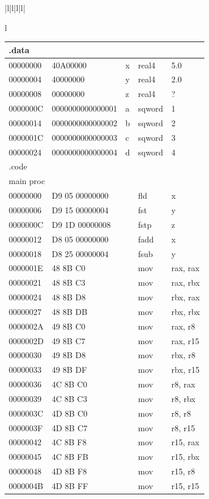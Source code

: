 \documentclass[10pt]{book}
\begin{document}
\begin{center}
\begin{tabular}{|l|l|l|l|}
\begin{tabular}{l}
\begin{center}
\begin{tabular}{|l|l|l|l|l|}
\hline
\multicolumn{5}{|l|}{.data} \\
\hline
00000000 & 40A00000 & x & real4 & 5.0 \\
\hline
00000004 & 40000000 & y & real4 & 2.0 \\
\hline
00000008 & 00000000 & z & real4 & ? \\
\hline
0000000C & 0000000000000001 & a & sqword & 1 \\
\hline
00000014 & 0000000000000002 & b & sqword & 2 \\
\hline
0000001C & 0000000000000003 & c & sqword & 3 \\
\hline
00000024 & 0000000000000004 & d & sqword & 4 \\
\hline
\multicolumn{5}{|l|}{.code} \\
\multicolumn{5}{|l|}{main proc} \\
\hline
00000000 & D9 05 00000000 &  & fld & x \\
\hline
00000006 & D9 15 00000004 &  & fst & y \\
\hline
0000000C & D9 1D 00000008 &  & fstp & z \\
\hline
00000012 & D8 05 00000000 &  & fadd & x \\
\hline
00000018 & D8 25 00000004 &  & fsub & y \\
\hline
0000001E & 48 8B C0 &  & mov & rax, rax \\
\hline
00000021 & 48 8B C3 &  & mov & rax, rbx \\
\hline
00000024 & 48 8B D8 &  & mov & rbx, rax \\
\hline
00000027 & 48 8B DB &  & mov & rbx, rbx \\
\hline
0000002A & 49 8B C0 &  & mov & rax, r8 \\
\hline
0000002D & 49 8B C7 &  & mov & rax, r15 \\
\hline
00000030 & 49 8B D8 &  & mov & rbx, r8 \\
\hline
00000033 & 49 8B DF &  & mov & rbx, r15 \\
\hline
00000036 & 4C 8B C0 &  & mov & r8, rax \\
\hline
00000039 & 4C 8B C3 &  & mov & r8, rbx \\
\hline
0000003C & 4D 8B C0 &  & mov & r8, r8 \\
\hline
0000003F & 4D 8B C7 &  & mov & r8, r15 \\
\hline
00000042 & 4C 8B F8 &  & mov & r15, rax \\
\hline
00000045 & 4C 8B FB &  & mov & r15, rbx \\
\hline
00000048 & 4D 8B F8 &  & mov & r15, r8 \\
\hline
0000004B & 4D 8B FF &  & mov & r15, r15 \\
\hline
\end{tabular}
\end{center}


\end{tabular}
\end{tabular}
\end{center}
\end{document}
